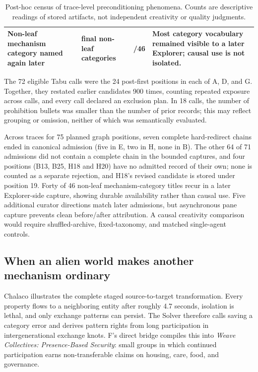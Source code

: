 \documentclass[11pt,a4paper]{article}
\begin{document}
\begin{table}[htbp]
\begin{tabularx}{\textwidth}{>{\raggedright\arraybackslash}p{43mm}>{\raggedright\arraybackslash}p{29mm}>{\raggedright\arraybackslash}p{22mm}X}
Non-leaf mechanism category named again later & 46 final non-leaf categories & 40/46 & Most category vocabulary remained visible to a later Explorer; causal use is not isolated. \\
\bottomrule
\end{tabularx}
\caption{Post-hoc census of trace-level preconditioning phenomena. Counts are descriptive readings of stored artifacts, not independent creativity or quality judgments.}
\label{tab:preconditioning-census}
\end{table}

The 72 eligible Tabu calls were the 24 post-first positions in each of A, D, and G. Together, they restated earlier candidates 900 times, counting repeated exposure across calls, and every call declared an exclusion plan. In 18 calls, the number of prohibition bullets was smaller than the number of prior records; this may reflect grouping or omission, neither of which was semantically evaluated.

Across traces for 75 planned graph positions, seven complete hard-redirect chains ended in canonical admission (five in E, two in H, none in B). The other 64 of 71 admissions did not contain a complete chain in the bounded captures, and four positions (B13, B25, H18 and H20) have no admitted record of their own; none is counted as a separate rejection, and H18's revised candidate is stored under position 19. Forty of 46 non-leaf mechanism-category titles recur in a later Explorer-side capture, showing durable availability rather than causal use. Five additional curator directions match later admissions, but asynchronous pane capture prevents clean before/after attribution. A causal creativity comparison would require shuffled-archive, fixed-taxonomy, and matched single-agent controls.

\subsection{When an alien world makes another mechanism ordinary}
\label{sec:alien-world-mechanism}

Chalaco illustrates the complete staged source-to-target transformation. Every property flows to a neighboring entity after roughly 4.7 seconds, isolation is lethal, and only exchange patterns can persist. The Solver therefore calls saving a category error and derives pattern rights from long participation in intergenerational exchange knots. F's direct bridge compiles this into \emph{Weave Collectives: Presence-Based Security}: small groups in which continued participation earns non-transferable claims on housing, care, food, and governance.
\end{document}
